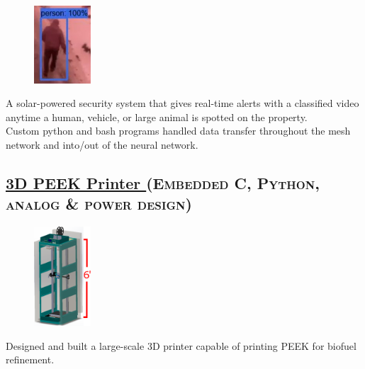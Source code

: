 \documentclass[
	10pt, %
]{FreemanCV}
\begin{document}
\begin{paracol}{2}
\setlength\intextsep{0pt} %
\begin{figure} %
	\hspace*{-5pt} %
    \includegraphics[width=60pt]{security_system} %
\end{figure}

A solar-powered security system that gives real-time alerts with a classified video anytime a human, vehicle, or large animal is spotted
on the property.\\

Custom python and bash programs handled data transfer throughout the mesh network and into/out of the neural network.

\switchcolumn

\vspace*{-10pt}
\leavevmode \subsection{\href{https://github.com/jfcbooth/3dpp}{3D PEEK Printer \linkcolor\scriptsize\faLink}
\hfill
\textsc{\footnotesize{(Embedded C, Python, analog \& power design)}}}

\setlength\intextsep{-5pt} %
\begin{figure} %
	\hspace*{-5pt} %
    \includegraphics[width=60pt]{printer} %
\end{figure}

Designed and built a large-scale 3D printer capable of printing PEEK for biofuel refinement.\\


\end{paracol}
\end{document}
